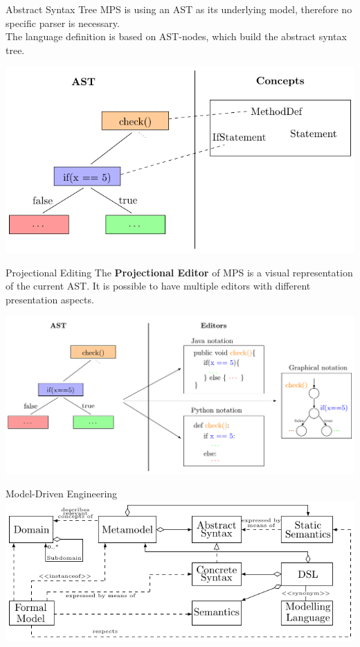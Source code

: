 	\begin{frame}{Abstract Syntax Tree}
		MPS is using an AST as its underlying model, therefore no specific parser is necessary.\\
		
		The language definition is based on AST-nodes, which build the abstract syntax tree.
		\begin{center}
			\includegraphics[height=0.7\textheight]{tikz/ast.pdf}
		\end{center}
	\end{frame}

	\begin{frame}{Projectional Editing}
		The \textbf{Projectional Editor} of MPS is a visual representation of the current AST. It is possible to have multiple editors with different presentation aspects.
		\begin{center}
			\includegraphics[height=0.7\textheight]{tikz/editors.pdf}
		\end{center}
	\end{frame}

	\begin{frame}{Model-Driven Engineering}
		\includegraphics[width=\textwidth]{tikz/mdsd_concept.pdf}
	\end{frame}

